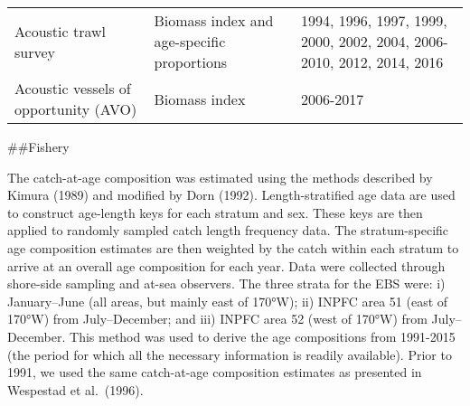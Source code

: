 \begin{longtable}[]{@{}lll@{}}
\begin{minipage}[t]{0.26\columnwidth}\raggedright
Acoustic trawl survey\strut
\end{minipage} & \begin{minipage}[t]{0.22\columnwidth}\raggedright
Biomass index and age-specific proportions\strut
\end{minipage} & \begin{minipage}[t]{0.43\columnwidth}\raggedright
1994, 1996, 1997, 1999, 2000, 2002, 2004, 2006-2010, 2012, 2014,
2016\strut
\end{minipage}\tabularnewline
\begin{minipage}[t]{0.26\columnwidth}\raggedright
Acoustic vessels of opportunity (AVO)\strut
\end{minipage} & \begin{minipage}[t]{0.22\columnwidth}\raggedright
Biomass index\strut
\end{minipage} & \begin{minipage}[t]{0.43\columnwidth}\raggedright
2006-2017\strut
\end{minipage}\tabularnewline
\bottomrule
\end{longtable}

\#\#Fishery

The catch-at-age composition was estimated using the methods described
by Kimura (1989) and modified by Dorn (1992). Length-stratified age data
are used to construct age-length keys for each stratum and sex. These
keys are then applied to randomly sampled catch length frequency data.
The stratum-specific age composition estimates are then weighted by the
catch within each stratum to arrive at an overall age composition for
each year. Data were collected through shore-side sampling and at-sea
observers. The three strata for the EBS were: i) January--June (all
areas, but mainly east of 170°W); ii) INPFC area 51 (east of 170°W) from
July--December; and iii) INPFC area 52 (west of 170°W) from
July--December. This method was used to derive the age compositions from
1991-2015 (the period for which all the necessary information is readily
available). Prior to 1991, we used the same catch-at-age composition
estimates as presented in Wespestad et al.~(1996).

